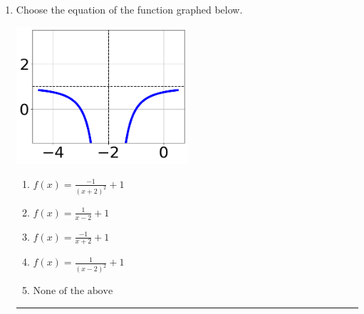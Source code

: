 \documentclass[14pt]{extbook}
\newcommand{\litem}[1]{\item#1\hspace*{-1cm}\rule{\textwidth}{0.4pt}}
\begin{document}
\begin{enumerate}
{\begin{enumerate}[label=\Alph*.]
\end{enumerate} }
\litem{
Choose the equation of the function graphed below.
\begin{center}
    \includegraphics[width=0.5\textwidth]{../Figures/rationalGraphToEquationCopyC.png}
\end{center}
\begin{enumerate}[label=\Alph*.]
\item \( f(x) = \frac{-1}{(x + 2)^2} + 1 \)
\item \( f(x) = \frac{1}{x - 2} + 1 \)
\item \( f(x) = \frac{-1}{x + 2} + 1 \)
\item \( f(x) = \frac{1}{(x - 2)^2} + 1 \)
\item \( \text{None of the above} \)


\end{enumerate}}
\end{enumerate}
\end{document}
